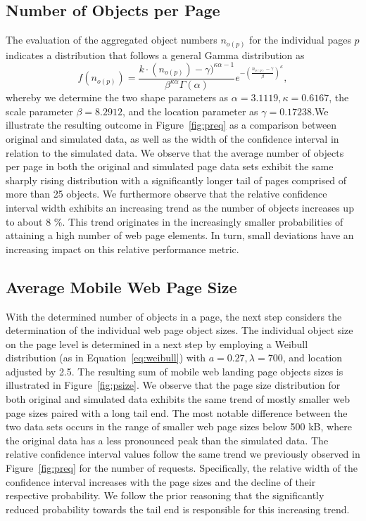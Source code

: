\subsection{Number of Objects per Page}
The evaluation of the aggregated object numbers $n_{o(p)}$ for the individual pages $p$ indicates a distribution that follows a general Gamma distribution as 
\begin{equation}\label{eq:gg}
f\left( n_{o(p)} \right) = \frac{ k \cdot (n_{o(p)})-\gamma)^{\kappa\alpha-1} }{\beta^{\kappa\alpha}\Gamma(\alpha)}e^{-\left(\frac{n_{o(p)}-\gamma}{\beta}\right)^\kappa},
\end{equation}
whereby we determine the two shape parameters as $\alpha=3.1119, \kappa=0.6167$, the scale parameter $\beta=8.2912$, and the location parameter as $\gamma=0.17238$.
​
We illustrate the resulting outcome in Figure~\ref{fig:preq} as a comparison between original and simulated data, as well as the  width of the confidence interval in relation to the simulated data.
We observe that the average number of objects per page in both the original and simulated page data sets exhibit the same sharply rising distribution with a significantly longer tail of pages comprised of more than 25 objects.
We furthermore observe that the relative confidence interval width exhibits an increasing trend as the number of objects increases up to about 8 \%. 
This trend originates in the increasingly smaller probabilities of attaining a high number of web page elements. In turn, small deviations have an increasing impact on this relative performance metric. 



\subsection{Average Mobile Web Page Size}
With the determined number of objects in a page, the next step considers the determination of the individual web page object sizes.
The individual object size on the page level is determined in a next step by employing a Weibull distribution (as in Equation~\ref{eq:weibull}) with $a=0.27 ,\lambda=700$, and location adjusted by 2.5.
The resulting sum of mobile web landing page objects sizes is illustrated in Figure~\ref{fig:psize}.
We observe that the page size distribution for both original and simulated data  exhibits the same trend of mostly smaller web page sizes paired with a long tail end.
The most notable difference between the two data sets occurs in the range of smaller web page sizes below 500 kB, where the original data has a less pronounced peak than the simulated data.
The relative confidence interval values follow the same trend we previously observed in Figure~\ref{fig:preq} for the number of requests.
Specifically, the relative width of the confidence interval increases with the page sizes and the decline of their respective probability.
We follow the prior reasoning that the significantly reduced probability towards the tail end is responsible for this increasing trend.  


